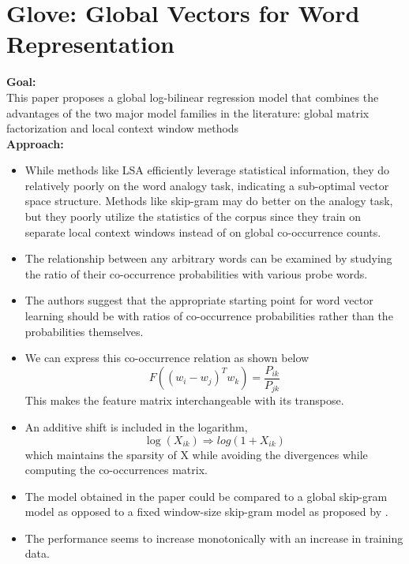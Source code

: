 \documentclass[11pt,a4paper]{article}
\begin{document}


\section{Glove: Global Vectors for Word Representation} %
\label{sec:glove_global_vectors_for_word_representation}

  \textbf{Goal:}\\
  This paper proposes a global log-bilinear regression model that combines the advantages of the two major model families in the literature: global matrix factorization and local context window methods\\

  \textbf{Approach:}
  \begin{itemize}
    \item 
    While methods like LSA efficiently leverage statistical information, they do relatively poorly on the word analogy task, indicating a sub-optimal vector space structure. Methods like skip-gram may do better on the analogy task, but they poorly utilize the statistics of the corpus since they train on separate local context windows instead of on global co-occurrence counts.
    \item 
    The relationship between any arbitrary words can be examined by studying the ratio of their co-occurrence probabilities with various probe words.
    \item 
    The authors suggest that the appropriate starting point for word vector learning should be with ratios of co-occurrence probabilities rather than the probabilities themselves.
    \item 
    We can express this co-occurrence relation as shown below
    $$F((w_i - w_j)^T w_k) = \frac{P_{ik}}{P_{jk}}$$
    This makes the feature matrix interchangeable with its transpose.
    \item 
    An additive shift is included in the logarithm, $$\log(X_{ik}) \Rightarrow log(1 + X_{ik})$$ which maintains the sparsity of X while avoiding the divergences while computing the co-occurrences matrix.
    \item 
    The model obtained in the paper could be compared to a global skip-gram model as opposed to a fixed window-size skip-gram model as proposed by \cite{mikolov2013efficient}.
    \item 
    The performance seems to increase monotonically with an increase in training data.
  \end{itemize}
\end{document}
